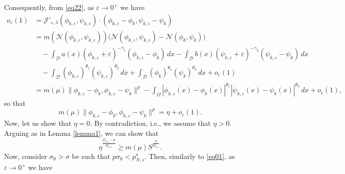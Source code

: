 \documentclass[reqno]{amsart}
\begin{document}
Consequently, from \eqref{eq22}, as $\varepsilon\to 0^+$ we have
\begin{align*}
o_\varepsilon(1)
&=\mathcal{J}'_{\varepsilon,\lambda}(\phi_{k,\varepsilon},\psi_{k,\varepsilon})\cdot(\phi_{k,\varepsilon}-\phi_k,\psi_{k,\varepsilon}-\psi_k)\\
&=m(\mathcal{N}(\phi_{k,\varepsilon},\psi_{k,\varepsilon}))\Big(\mathcal{N}(\phi_{k,\varepsilon},\psi_{k,\varepsilon})-\mathcal{N}(\phi_k,\psi_k)\Big)\\
&\quad -\int_\mathcal{D}a(x) (\phi_{k,\varepsilon}+\varepsilon)^{-\gamma_1}(\phi_{k,\varepsilon}-\phi_k)\,dx-\int_\mathcal{D}b(x) (\psi_{k,\varepsilon}+\varepsilon)^{-\gamma_2}(\psi_{k,\varepsilon}-\psi_k)\,dx\\
&\quad -\int_\mathcal{D}(\phi_{k,\varepsilon})^{\theta_1}(\psi_{k,\varepsilon})^{\theta_2}\,dx+\int_\mathcal{D}(\phi_k)^{\theta_1}(\psi_k)^{\theta_2}\,dx+ o_\varepsilon(1)  \\
&=m(\mu)\| \phi_{k,\varepsilon}-\phi_k,\phi_{k,\varepsilon}-\psi_k\|^p-\int_\Omega |\phi_{k,\varepsilon}(x)-\phi_k(x)|^{\theta_1}|\psi_{k,\varepsilon}(x)-\psi_k(x)|^{\theta_2}\,dx+o_\varepsilon(1),
\end{align*}
so that 
$$
m(\mu)\| \phi_{k,\varepsilon}-\phi_k,\phi_{k,\varepsilon}-\psi_k\|^p
=\eta+o_\varepsilon(1).
$$
Now, let us show that $\eta=0$. By contradiction, i.e., we assume that $\eta>0$. 
Arguing as in Lemma \ref{lemma1}, we can show that
\begin{equation}
\eta^\frac{p^\star_{N,s}-p}{p^\star_{N,s}}\geq m(\mu)S^\frac{p}{p^\star_{N,s}}.
\end{equation}
Now, consider $\sigma_0>\sigma$ be such that $p\sigma_0<p_{N,s}^\star$. 
Then, similarly to \eqref{eq01}, as $\varepsilon\to 0^+$ we have
\end{document}
